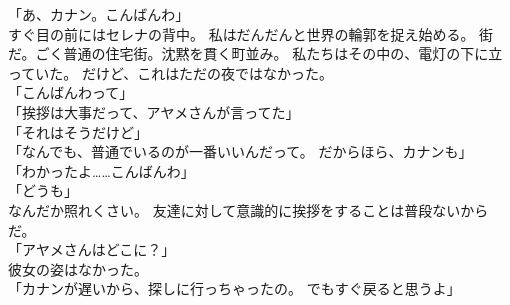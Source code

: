 \documentclass[../IHMain]{subfiles}
\begin{document}
「あ、カナン。こんばんわ」\\
すぐ目の前にはセレナの背中。
私はだんだんと世界の輪郭を捉え始める。
街だ。ごく普通の住宅街。沈黙を貫く町並み。
私たちはその中の、電灯の下に立っていた。
だけど、これはただの夜ではなかった。\\
「こんばんわって」\\
「挨拶は大事だって、アヤメさんが言ってた」\\
「それはそうだけど」\\
「なんでも、普通でいるのが一番いいんだって。
だからほら、カナンも」\\
「わかったよ……こんばんわ」\\
「どうも」\\
なんだか照れくさい。
友達に対して意識的に挨拶をすることは普段ないからだ。\\
「アヤメさんはどこに？」\\
彼女の姿はなかった。\\
「カナンが遅いから、探しに行っちゃったの。
でもすぐ戻ると思うよ」
\end{document}
